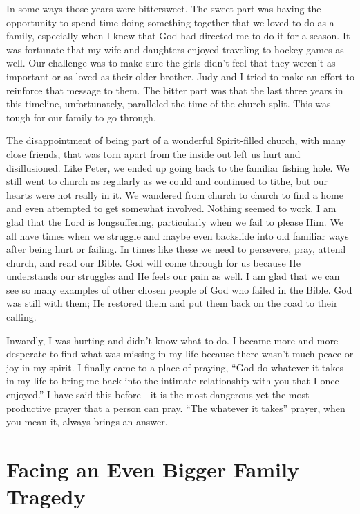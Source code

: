 \documentclass[oneside]{book}
\begin{document}
In some ways those years were bittersweet. The sweet part was having the opportunity to spend time doing something together that we loved to do as a family, especially when I knew that God had directed me to do it for a season. It was fortunate that my wife and daughters enjoyed traveling to hockey games as well. Our challenge was to make sure the girls didn't feel that they weren't as important or as loved as their older brother. Judy and I tried to make an effort to reinforce that message to them. The bitter part was that the last three years in this timeline, unfortunately, paralleled the time of the church split. This was tough for our family to go through.

The disappointment of being part of a wonderful Spirit-filled church, with many close friends, that was torn apart from the inside out left us hurt and disillusioned. Like Peter, we ended up going back to the familiar fishing hole. We still went to church as regularly as we could and continued to tithe, but our hearts were not really in it. We wandered from church to church to find a home and even attempted to get somewhat involved. Nothing seemed to work. I am glad that the Lord is longsuffering, particularly when we fail to please Him. We all have times when we struggle and maybe even backslide into old familiar ways after being hurt or failing. In times like these we need to persevere, pray, attend church, and read our Bible. God will come through for us because He understands our struggles and He feels our pain as well. I am glad that we can see so many examples of other chosen people of God who failed in the Bible. God was still with them; He restored them and put them back on the road to their calling.

Inwardly, I was hurting and didn't know what to do. I became more and more desperate to find what was missing in my life because there wasn't much peace or joy in my spirit. I finally came to a place of praying, “God do whatever it takes in my life to bring me back into the intimate relationship with you that I once enjoyed.” I have said this before—it is the most dangerous yet the most productive prayer that a person can pray. “The whatever it takes” prayer, when you mean it, always brings an answer.


\section{Facing an Even Bigger Family Tragedy}
\
\end{document}
